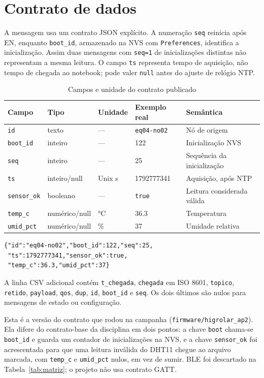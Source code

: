 \section{Contrato de dados}\label{sec:contrato-dados}
A mensagem usa um contrato JSON explícito. A numeração \texttt{seq} reinicia após EN, enquanto \texttt{boot\_id}, armazenado na NVS com \texttt{Preferences}, identifica a inicialização. Assim duas mensagens com \texttt{seq=1} de inicializações distintas não representam a mesma leitura. O campo \texttt{ts} representa tempo de aquisição, não tempo de chegada ao notebook; pode valer \texttt{null} antes do ajuste de relógio NTP.
\begin{table}[H]\centering\caption{Campos e unidade do contrato publicado}\label{tab:contrato-dados}\footnotesize
\begin{tabular}{@{}L{2.15cm}L{1.55cm}L{1.9cm}L{3cm}L{4.5cm}@{}}\toprule
Campo&Tipo&Unidade&Exemplo real&Semântica\\\midrule
\texttt{id}&texto&---&\texttt{eq04-no02}&Nó de origem\\
\texttt{boot\_id}&inteiro&---&122&Inicialização NVS\\
\texttt{seq}&inteiro&---&25&Sequência da inicialização\\
\texttt{ts}&inteiro/null&Unix s&1792777341&Aquisição, após NTP\\
\texttt{sensor\_ok}&booleano&---&\texttt{true}&Leitura considerada válida\\
\texttt{temp\_c}&numérico/null&\si{\celsius}&36.3&Temperatura\\
\texttt{umid\_pct}&numérico/null&\%&37&Umidade relativa\\\bottomrule\end{tabular}\end{table}
\begin{lstlisting}[style=terminal,caption={Telemetria real com identificador de inicialização},label={lst:payload}]
{"id":"eq04-no02","boot_id":122,"seq":25,
 "ts":1792777341,"sensor_ok":true,
 "temp_c":36.3,"umid_pct":37}
\end{lstlisting}
A linha CSV adicional contém \texttt{t\_chegada}, \texttt{chegada} em ISO 8601, \texttt{topico}, \texttt{retido}, \texttt{payload}, \texttt{qos}, \texttt{dup}, \texttt{id}, \texttt{boot\_id} e \texttt{seq}. Os dois últimos são nulos para mensagens de estado ou configuração.\par
Esta é a versão do contrato que rodou na campanha (\texttt{firmware/higrolar\_ap2}). Ela difere do contrato-base da disciplina em dois pontos: a chave \texttt{boot} chama-se \texttt{boot\_id} e guarda um contador de inicializações na NVS, e a chave \texttt{sensor\_ok} foi acrescentada para que uma leitura inválida do DHT11 chegue ao arquivo marcada, com \texttt{temp\_c} e \texttt{umid\_pct} nulos, em vez de sumir. BLE foi descartado na Tabela~\ref{tab:matriz}; o projeto não usa contrato GATT.\par
